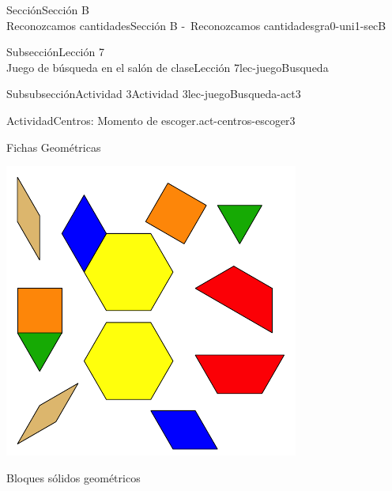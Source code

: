 \begin{sectionptx}{Sección}{{\Large Sección B\\}Reconozcamos cantidades}{}{Sección B -~Reconozcamos cantidades}{}{}{gra0-uni1-secB}
\begin{subsectionptx}{Subsección}{{\normalsize Lección 7\\[-0.05cm]}Juego de búsqueda en el salón de clase}{}{Lección 7}{}{}{lec-juegoBusqueda}
\begin{subsubsectionptx}{Subsubsección}{Actividad 3}{}{Actividad 3}{}{}{lec-juegoBusqueda-act3}
\begin{activity}{Actividad}{Centros: Momento de escoger.}{act-centros-escoger3}
\begin{sidebyside}{2}{0.025}{0.025}{0.05}
\begin{sbspanel}{0.45}
\end{sbspanel}%
\begin{sbspanel}{0.45}%
Fichas Geométricas%
\par
\includegraphics[max width=\linewidth, center]{external/svg-source/tikz-file-147344.pdf}
\end{sbspanel}%
\end{sidebyside}%
\vspace*{1ex minus 0.8ex}
\begin{sidebyside}{2}{0.025}{0.025}{0.05}%
\begin{sbspanel}{0.45}%
Bloques sólidos geométricos%
\par

\end{sbspanel}
\end{sidebyside}
\end{activity}
\end{subsubsectionptx}
\end{subsectionptx}
\end{sectionptx}
